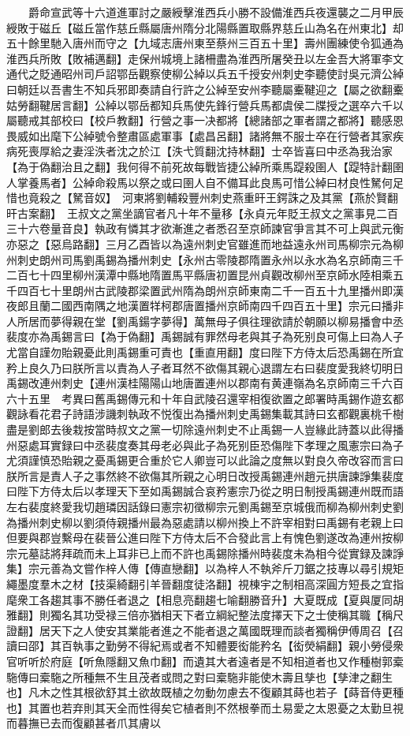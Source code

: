 　　爵命宣武等十六道進軍討之嚴綬擊淮西兵小勝不設備淮西兵夜還襲之二月甲辰綬敗于磁丘【磁丘當作慈丘縣屬唐州隋分北陽縣置取縣界慈丘山為名在州東北】却五十餘里馳入唐州而守之【九域志唐州東至蔡州三百五十里】壽州團練使令狐通為淮西兵所敗【敗補邁翻】走保州城境上諸柵盡為淮西所屠癸丑以左金吾大將軍李文通代之貶通昭州司戶詔鄂岳觀察使柳公綽以兵五千授安州刺史李聽使討吳元濟公綽曰朝廷以吾書生不知兵邪即奏請自行許之公綽至安州李聽屬櫜鞬迎之【屬之欲翻櫜姑勞翻鞬居言翻】公綽以鄂岳都知兵馬使先鋒行營兵馬都虞侯二牒授之選卒六千以屬聽戒其部校曰【校戶教翻】行營之事一决都將【總諸部之軍者謂之都將】聽感恩畏威如出麾下公綽號令整肅區處軍事【處昌呂翻】諸將無不服士卒在行營者其家疾病死喪厚給之妻淫泆者沈之於江【泆弋質翻沈持林翻】士卒皆喜曰中丞為我治家【為于偽翻治且之翻】我何得不前死故每戰皆捷公綽所乘馬踶殺圉人【踶特計翻圉人掌養馬者】公綽命殺馬以祭之或曰圉人自不備耳此良馬可惜公綽曰材良性駑何足惜也竟殺之【駑音奴】　河東將劉輔殺豐州刺史燕重旰王鍔誅之及其黨【燕於賢翻旰古案翻】　王叔文之黨坐謫官者凡十年不量移【永貞元年貶王叔文之黨事見二百三十六卷量音良】執政有憐其才欲漸進之者悉召至京師諫官爭言其不可上與武元衡亦惡之【惡烏路翻】三月乙酉皆以為遠州刺史官雖進而地益遠永州司馬柳宗元為柳州刺史朗州司馬劉禹錫為播州刺史【永州古零陵郡隋置永州以永水為名京師南三千二百七十四里柳州漢潭中縣地隋置馬平縣唐初置昆州貞觀改柳州至京師水陸相乘五千四百七十里朗州古武陵郡梁置武州隋為朗州京師東南二千一百五十九里播州即漢夜郎且蘭二國西南隅之地漢置䍧柯郡唐置播州京師南四千四百五十里】宗元曰播非人所居而夢得親在堂【劉禹鍚字夢得】萬無母子俱往理欲請於朝願以柳易播會中丞裴度亦為禹錫言曰【為于偽翻】禹錫誠有罪然母老與其子為死别良可傷上曰為人子尤當自謹勿貽親憂此則禹錫重可責也【重直用翻】度曰陛下方侍太后恐禹錫在所宜矜上良久乃曰朕所言以責為人子者耳然不欲傷其親心退謂左右曰裴度愛我終切明日禹錫改連州刺史【連州漢桂陽陽山地唐置連州以郡南有黄連嶺為名京師南三千六百六十五里　考異曰舊禹錫傳元和十年自武陵召還宰相復欲置之郎署時禹錫作遊玄都觀詠看花君子詩語涉譏刺執政不悦復出為播州刺史禹錫集載其詩曰玄都觀裏桃千樹盡是劉郎去後栽按當時叔文之黨一切除遠州刺史不止禹錫一人豈緣此詩蓋以此得播州惡處耳實録曰中丞裴度奏其母老必與此子為死别臣恐傷陛下孝理之風憲宗曰為子尤須謹慎恐貽親之憂禹錫更合重於它人卿豈可以此論之度無以對良久帝改容而言曰朕所言是責人子之事然終不欲傷其所親之心明日改授禹錫連州趙元拱唐諫諍集裴度曰陛下方侍太后以孝理天下至如禹錫誠合哀矜憲宗乃從之明日制授禹錫連州既而語左右裴度終愛我切趙璘因話錄曰憲宗初徵柳宗元劉禹錫至京城俄而柳為柳州刺史劉為播州刺史柳以劉須侍親播州最為惡處請以柳州換上不許宰相對曰禹錫有老親上曰但要與郡豈繫母在裴晉公進曰陛下方侍太后不合發此言上有愧色劉遂改為連州按柳宗元墓誌將拜疏而未上耳非已上而不許也禹錫除播州時裴度未為相今從實録及諫諍集】宗元善為文嘗作梓人傳【傳直戀翻】以為梓人不執斧斤刀鋸之技專以尋引規矩繩墨度羣木之材【技渠綺翻引羊晉翻度徒洛翻】視棟宇之制相高深圓方短長之宜指麾衆工各趨其事不勝任者退之【相息亮翻趨七喻翻勝音升】大夏既成【夏與厦同胡雅翻】則獨名其功受禄三倍亦猶相天下者立綱紀整法度擇天下之士使稱其職【稱尺證翻】居天下之人使安其業能者進之不能者退之萬國既理而談者獨稱伊傅周召【召讀曰邵】其百執事之勤勞不得紀焉或者不知體要衒能矜名【衒熒絹翻】親小勞侵衆官听听於府庭【听魚隱翻又魚巾翻】而遺其大者遠者是不知相道者也又作種樹郭槖駞傳曰槖駞之所種無不生且茂者或問之對曰槖駞非能使木壽且孳也【孳津之翻生也】凡木之性其根欲舒其土欲故既植之勿動勿慮去不復顧其蒔也若子【蒔音侍更種也】其置也若弃則其天全而性得矣它植者則不然根拳而土易愛之太恩憂之太勤旦視而暮撫已去而復顧甚者爪其膚以
